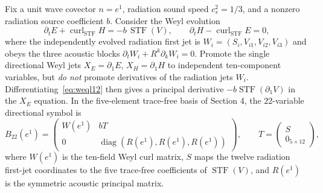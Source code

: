 \documentclass[11pt,a4paper]{article}
\newcommand{\STF}{\operatorname{STF}}
\newcommand{\curl}{\operatorname{curl}}
\begin{document}
Fix a unit wave covector $n=e^1$, radiation sound speed $c_s^2=1/3$, and a nonzero radiation source coefficient $b$. Consider the Weyl evolution
\begin{equation}\label{eq:weql12}
\partial_tE+\curl_{\mathrm{STF}}H=-b\,\STF(V),\qquad
\partial_tH-\curl_{\mathrm{STF}}E=0,
\end{equation}
where the independently evolved radiation first jet is $W_i=(S_i,V_{i1},V_{i2},V_{i3})$ and obeys the three acoustic blocks
$\partial_tW_i+R^k\partial_kW_i=0$.
Promote the single directional Weyl jets $X_E=\partial_1E$, $X_H=\partial_1H$ to independent ten-component variables, but \emph{do not} promote derivatives of the radiation jets $W_i$. Differentiating~\eqref{eq:weql12} then gives a principal derivative $-b\STF(\partial_1V)$ in the $X_E$ equation. In the five-element trace-free basis of Section 4, the $22$-variable directional symbol is
\begin{equation}\label{eq:B22}
B_{22}(e^1)=
\begin{pmatrix}
W(e^1)&bT\\
0&\operatorname{diag}(R(e^1),R(e^1),R(e^1))
\end{pmatrix},
\qquad T=\begin{pmatrix}S\\0_{5\times12}\end{pmatrix},
\end{equation}
where $W(e^1)$ is the ten-field Weyl curl matrix, $S$ maps the twelve radiation first-jet coordinates to the five trace-free coefficients of $\STF(V)$, and $R(e^1)$ is the symmetric acoustic principal matrix.
\end{document}
